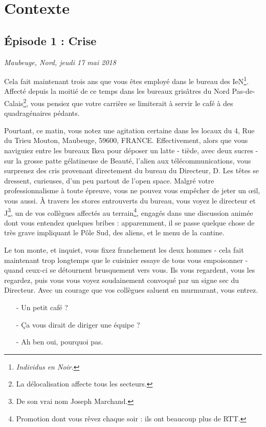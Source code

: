 \newpage

\section{Contexte}
\subsection{Épisode 1 : Crise}
\hfill \textit{Maubeuge, Nord, jeudi 17 mai 2018}

Cela fait maintenant trois ans que vous êtes employé dans le bureau des
IeN\footnote{\emph{Individus en Noir}\texttrademark.}.  Affecté depuis la moitié
de ce temps dans les bureaux grisâtres du Nord Pas-de-Calais\footnote{La
délocalisation affecte tous les secteurs.}, vous pensiez que votre carrière se
limiterait à servir le café à des quadragénaires pédants. 

Pourtant, ce matin, vous notez une agitation certaine dans les locaux du 4, Rue
du Trieu Mouton, Maubeuge, 59600, FRANCE.  Effectivement, alors que vous
naviguiez entre les bureaux Ikea pour déposer un latte - tiède, avec deux sucres
- sur la grosse patte gélatineuse de Beauté, l'alien aux télécommunications,
vous surprenez des cris provenant directement du bureau du Directeur, D. Les
têtes se dressent, curieuses, d'un peu partout de l'open space. Malgré votre
professionnalisme à toute épreuve, vous ne pouvez vous empêcher de jeter un œil,
vous aussi. À travers les stores entrouverts du bureau, vous voyez le directeur
et J\footnote{De son vrai nom Joseph Marchand.}, un de vos collègues affectés au
terrain\footnote{Promotion dont vous rêvez chaque soir : ils ont beaucoup plus
de RTT.}, engagés dans une discussion animée dont vous entendez quelques bribes
: apparemment, il se passe quelque chose de très grave impliquant le Pôle Sud,
des aliens, et le menu de la cantine.

Le ton monte, et inquiet, vous fixez franchement les deux hommes - cela fait
maintenant trop longtemps que le cuisinier essaye de tous vous empoisonner -
quand ceux-ci se détournent brusquement vers vous. Ils vous regardent, vous les
regardez, puis vous vous voyez soudainement convoqué par un signe sec du
Directeur. Avec un courage que vos collègues saluent en murmurant, vous entrez.

\begin{itemize}
\item[-] Un petit café ?
\item[-] Ça vous dirait de diriger une équipe ?
\item[-] Ah ben oui, pourquoi pas.
\end{itemize}

